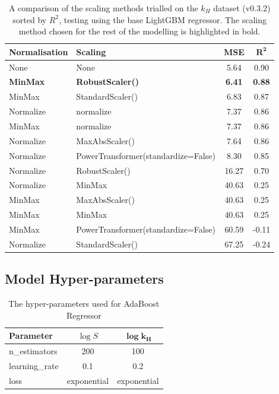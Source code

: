 \documentclass[11pt, titlepage]{article}
\begin{document}
\begin{table}[H]
    \centering
    \begin{tabular}{|l|l|c|c|}
    \hline
        \textbf{Normalisation} & \textbf{Scaling} & \textbf{MSE} & $\mathbf{R^2}$ \\ 
		\hline
        None & None & 5.64 & 0.90 \\ 
        \textbf{MinMax} & \textbf{RobustScaler()} & \textbf{6.41} & \textbf{0.88} \\ 
		MinMax & StandardScaler() & 6.83 & 0.87 \\ 
        Normalize & normalize & 7.37 & 0.86 \\ 
        MinMax & normalize & 7.37 & 0.86 \\ 
        Normalize & MaxAbsScaler() & 7.64 & 0.86 \\ 
        Normalize & PowerTransformer(standardize=False) & 8.30 & 0.85 \\ 
        Normalize & RobustScaler() & 16.27 & 0.70 \\ 
        Normalize & MinMax & 40.63 & 0.25 \\ 
        MinMax & MaxAbsScaler() & 40.63 & 0.25 \\ 
        MinMax & MinMax & 40.63 & 0.25 \\ 
        MinMax & PowerTransformer(standardize=False) & 60.59 & -0.11 \\ 
        Normalize & StandardScaler() & 67.25 & -0.24 \\
		\hline
    \end{tabular}
	\caption{A comparison of the scaling methods trialled on the {$k_H$} dataset (v0.3.2) sorted by $R^2$, testing using the base LightGBM regressor. The scaling method chosen for the rest of the modelling is highlighted in bold.}
	\label{tab:ScalingLogH}
\end{table}

\subsection{Model Hyper-parameters}
\label{subsec:ModelHyperparameters}

\begin{table}[H]
	\centering\small
	\begin{tabular}{|l|c|c|}
		\hline
		\textbf{Parameter} & $\log S$ & $\mathbf{\log k_H}$ \\
		\hline
		n\_estimators & 200 & 100 \\
		learning\_rate & 0.1 & 0.2 \\
		loss & exponential & exponential\\
		\hline
	\end{tabular}
	\caption{The hyper-parameters used for AdaBoost Regressor}
	\label{tab:AdaBoost_params}
\end{table}
\end{document}
